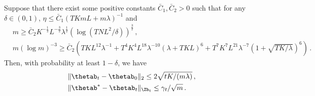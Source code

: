 \documentclass{article}
\theoremstyle{plain}
\begin{document}
\begin{lemma} \label{extended lemma:lemma 5.2 in NeuralUCB}
Suppose that there exist some positive constants $\bar{C}_1, \bar{C}_2 > 0$ such that for any $\delta \in (0,1)$, $\eta \le \bar{C}_1 (T K m L + m \lambda)^{-1}$ and
%
    \begin{align*}
        & m \ge \bar{C}_2 K^{-\frac{1}{2}} L^{-\frac{3}{2}} \lambda^{\frac{1}{2}} \left( \log(TNL^2/\delta) \right)^{\frac{3}{2}} \, ,
        \\
        & m (\log m)^{-3} \ge \bar{C}_2 \left(
            T K L^{12} \lambda^{-1}
            + T^4 K^4 L^{18} \lambda^{-10} (\lambda +T K L)^6
            + T^7 K^7 L^{21} \lambda^{-7} (1 + \sqrt{TK/\lambda})^6 \right) \, .
    \end{align*}
%
Then, with probability at least $1 - \delta$, we have
%
    \begin{align*}
        & \| \thetab_t - \thetab_0 \|_2 \le 2 \sqrt{tK/(m\lambda)} \, ,
        \\
        & \| \thetab^* - \thetab_t \|_{\Zb_t} \le \gamma_t / \sqrt{m} \, .
    \end{align*}
%    
\end{lemma}
\end{document}
